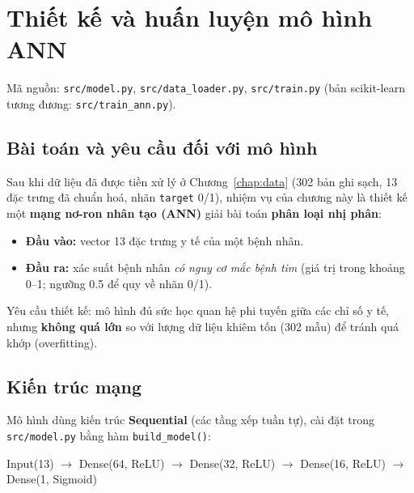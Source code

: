 
\chapter{Thiết kế và huấn luyện mô hình ANN}
\label{chap:model}

Mã nguồn: \texttt{src/model.py}, \texttt{src/data\_loader.py},
\texttt{src/train.py} (bản scikit-learn tương đương:
\texttt{src/train\_ann.py}).

\section{Bài toán và yêu cầu đối với mô hình}
Sau khi dữ liệu đã được tiền xử lý ở Chương~\ref{chap:data} (302 bản ghi sạch,
13 đặc trưng đã chuẩn hoá, nhãn \texttt{target} 0/1), nhiệm vụ của chương này
là thiết kế một \textbf{mạng nơ-ron nhân tạo (ANN)} giải bài toán \textbf{phân
loại nhị phân}:
\begin{itemize}
  \item \textbf{Đầu vào:} vector 13 đặc trưng y tế của một bệnh nhân.
  \item \textbf{Đầu ra:} xác suất bệnh nhân \emph{có nguy cơ mắc bệnh tim}
        (giá trị trong khoảng 0--1; ngưỡng 0.5 để quy về nhãn 0/1).
\end{itemize}
Yêu cầu thiết kế: mô hình đủ sức học quan hệ phi tuyến giữa các chỉ số y tế,
nhưng \textbf{không quá lớn} so với lượng dữ liệu khiêm tốn (302 mẫu) để tránh
quá khớp (overfitting).

\section{Kiến trúc mạng}
Mô hình dùng kiến trúc \textbf{Sequential} (các tầng xếp tuần tự), cài đặt
trong \texttt{src/model.py} bằng hàm \texttt{build\_model()}:
\begin{center}
  Input(13) $\to$ Dense(64, ReLU) $\to$ Dense(32, ReLU) $\to$
  Dense(16, ReLU) $\to$ Dense(1, Sigmoid)
\end{center}

